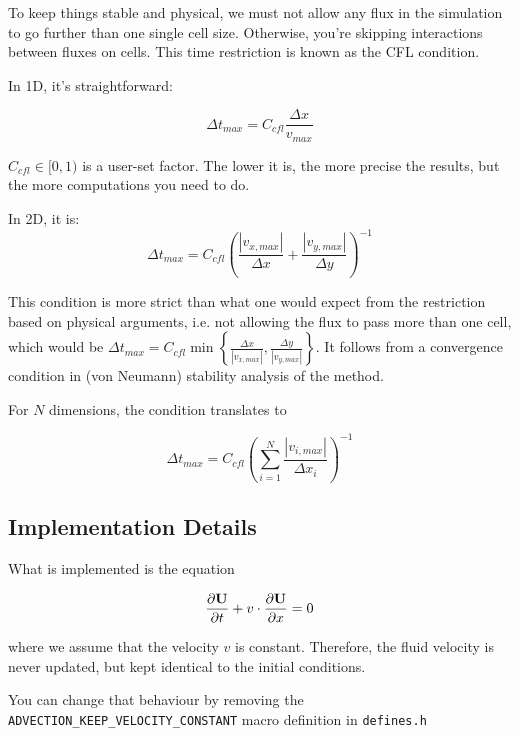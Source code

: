 To keep things stable and physical, we must not allow any flux in the simulation to go further than one single cell size.
Otherwise, you're skipping interactions between fluxes on cells.
This time restriction is known as the CFL condition.

In 1D, it's straightforward:

\begin{equation}
	\Delta t_{max} = C_{cfl} \frac{\Delta x}{v_{max}} \label{eq:CFL1D}
\end{equation}

$C_{cfl} \in [0, 1) $ is a user-set factor.
The lower it is, the more precise the results, but the more computations you need to do.

In 2D, it is:
\begin{equation}
	\Delta t_{max} = C_{cfl} \left( \frac{|v_{x,max}|}{\Delta x} +  \frac{|v_{y,max}|}{\Delta y} \right)^{-1} \label{eq:CFL2D}
\end{equation}

This condition is more strict than what one would expect from the restriction based on physical arguments, i.e. not allowing the flux to pass more than one cell, which would be $\Delta t_{max} = C_{cfl} \min \left\{ \frac{\Delta x}{|v_{x,max}|} ,  \frac{\Delta y}{|v_{y,max}|} \right\} $.
It follows from a convergence condition in (von Neumann) stability analysis of the method.

For $N$ dimensions, the condition translates to

\begin{equation}
	\Delta t_{max} = C_{cfl} \left( \sum_{i=1}^{N} \frac{|v_{i,max}|}{\Delta x_i} \right)^{-1}  \label{eq:CFLND}
\end{equation}








\subsection{Implementation Details}


What is implemented is the equation

\begin{equation}
    \frac{\partial \mathbf{U}}{\partial t} + v \cdot \frac{\partial \mathbf{U}}{\partial x} = 0
\end{equation}


where we assume that the velocity $v$ is constant. 
Therefore, the fluid velocity is never updated, but kept identical to the initial conditions.

You can change that behaviour by removing the \verb|ADVECTION_KEEP_VELOCITY_CONSTANT| macro definition in \verb|defines.h|

